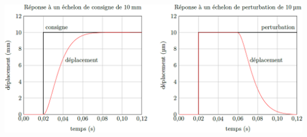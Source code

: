 \begin{center}
\includegraphics[width=.8\linewidth]{images/fig_06}
\end{center}

\begin{center}
\end{center}


